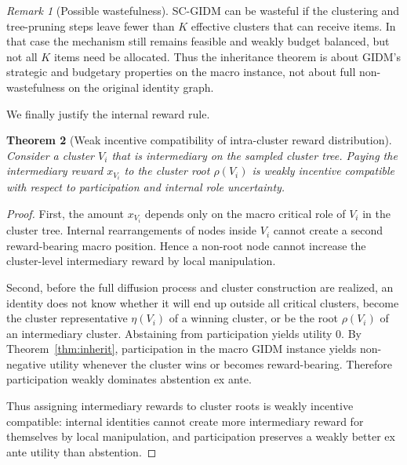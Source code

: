 \documentclass[sigconf]{aamas}
\newtheorem{theorem}{Theorem}
\theoremstyle{definition}
\theoremstyle{remark}
\newtheorem{remark}[theorem]{Remark}
\begin{document}
\begin{remark}[Possible wastefulness]
SC-GIDM can be wasteful if the clustering and tree-pruning steps leave fewer than $K$ effective clusters that can receive items. In that case the mechanism still remains feasible and weakly budget balanced, but not all $K$ items need be allocated. Thus the inheritance theorem is about GIDM's strategic and budgetary properties on the macro instance, not about full non-wastefulness on the original identity graph.
\end{remark}

We finally justify the internal reward rule.
\begin{theorem}[Weak incentive compatibility of intra-cluster reward distribution]
\label{thm:weakreward}
Consider a cluster $V_i$ that is intermediary on the sampled cluster tree. Paying the intermediary reward $x_{V_i}$ to the cluster root $\rho(V_i)$ is weakly incentive compatible with respect to participation and internal role uncertainty.
\end{theorem}
\begin{proof}
First, the amount $x_{V_i}$ depends only on the macro critical role of $V_i$ in the cluster tree. Internal rearrangements of nodes inside $V_i$ cannot create a second reward-bearing macro position. Hence a non-root node cannot increase the cluster-level intermediary reward by local manipulation.

Second, before the full diffusion process and cluster construction are realized, an identity does not know whether it will end up outside all critical clusters, become the cluster representative $\eta(V_i)$ of a winning cluster, or be the root $\rho(V_i)$ of an intermediary cluster. Abstaining from participation yields utility $0$. By Theorem~\ref{thm:inherit}, participation in the macro GIDM instance yields non-negative utility whenever the cluster wins or becomes reward-bearing. Therefore participation weakly dominates abstention ex ante.

Thus assigning intermediary rewards to cluster roots is weakly incentive compatible: internal identities cannot create more intermediary reward for themselves by local manipulation, and participation preserves a weakly better ex ante utility than abstention.
\end{proof}
\end{document}
